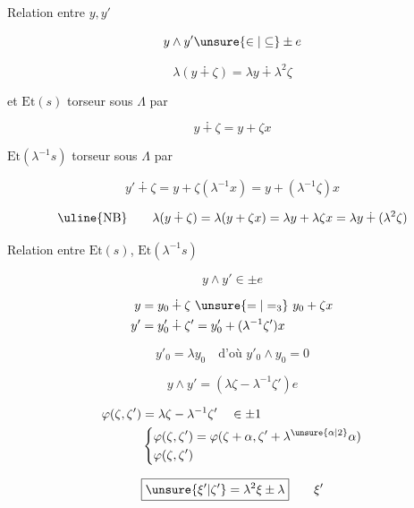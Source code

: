 

Relation entre $y,y'$

\[
y\wedge y'\unsure{\in|\subseteq}\pm e
\]

\[
\boxed{\lambda(y\dotplus\zeta)=\lambda y\dotplus\lambda^2\zeta}
\]


et $\mathrm{Et}(s)$ torseur sous $\Lambda$ par

\[
y\dotplus\zeta=y+\zeta x
\]

$\mathrm{Et}(\lambda^{-1}s)$ torseur sous $\Lambda$ par

\[
y'\dotplus\zeta=y+\zeta(\lambda^{-1}x)=y+(\lambda^{-1}\zeta)x
\]

\[
\text{\uline{NB}}\qquad\lambda(y\dotplus\zeta)=\lambda(y+\zeta x)=\lambda y+\lambda\zeta x=\lambda y\dotplus(\lambda^2\zeta)
\]

Relation  entre $\mathrm{Et}(s)$, $\mathrm{Et}(\lambda^{-1}s)$

\[
y\wedge y'\in\pm e
\]

\[
\begin{aligned}
y&=y_0\dotplus\zeta\ \unsure{=|=_{3}}\ y_0+\zeta x\\
y'&=y'_0\dotplus\zeta'=y'_0+(\lambda^{-1}\zeta')x
\end{aligned}
\]

\[
y'_0=\lambda y_0\quad\text{d'où }y'_0\wedge y_0=0
\]

\[
y\wedge y'=(\lambda\zeta-\lambda^{-1}\zeta')e
\]

\[
\begin{aligned}
\varphi(\zeta,\zeta')&=\lambda\zeta-\lambda^{-1}\zeta'\quad\in\pm1\\
&\left\{\begin{aligned}
\varphi(\zeta,\zeta')&=\varphi(\zeta+\alpha,\zeta'+\lambda^{\unsure{\alpha|2}}\alpha)\\
\varphi(\zeta,\zeta')&
\end{aligned}\right.
\end{aligned}
\]

\[
\boxed{\unsure{\xi'|\zeta'}=\lambda^2\xi\pm\lambda}\qquad\xi'
\]

